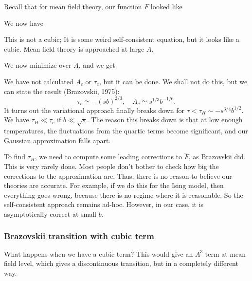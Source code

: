 \documentclass[a4paper]{article}
\begin{document}
Recall that for mean field theory, our function $F$ looked like
\begin{center}
\end{center}
We now have


This is not a cubic; It is some weird self-consistent equation, but it looks like a cubic. Mean field theory is approached at large $A$.

We now minimize over $A$, and we get


We have not calculated $A_c$ or $\tau_c$, but it can be done. We shall not do this, but we can state the result (Brazovskii, 1975):
\[
  \tau_c \simeq -(sb)^{2/3},\quad A_c \simeq s^{1/3} b^{-1/6}.
\]
It turns out the variational approach finally breaks down for $\tau < \tau_H \sim -s^{3/4} b^{1/2}$. We have $\tau_H \ll \tau_c$ if $b \ll \sqrt{s}$. The reason this breaks down is that at low enough temperatures, the fluctuations from the quartic terms become significant, and our Gaussian approximation falls apart.

To find $\tau_H$, we need to compute some leading corrections to $\tilde{F}$, as Brazovskii did. This is very rarely done. Most people don't bother to check how big the corrections to the approximation are. Thus, there is no reason to believe our theories are accurate. For example, if we do this for the Ising model, then everything goes wrong, because there is no regime where it is reasonable. So the self-consistent approach remains ad-hoc. However, in our case, it is asymptotically correct at small $b$.

\subsubsection*{Brazovskii transition with cubic term}
What happens when we have a cubic term? This would give an $A^3$ term at mean field level, which gives a discontinuous transition, but in a completely different way.
\end{document}
